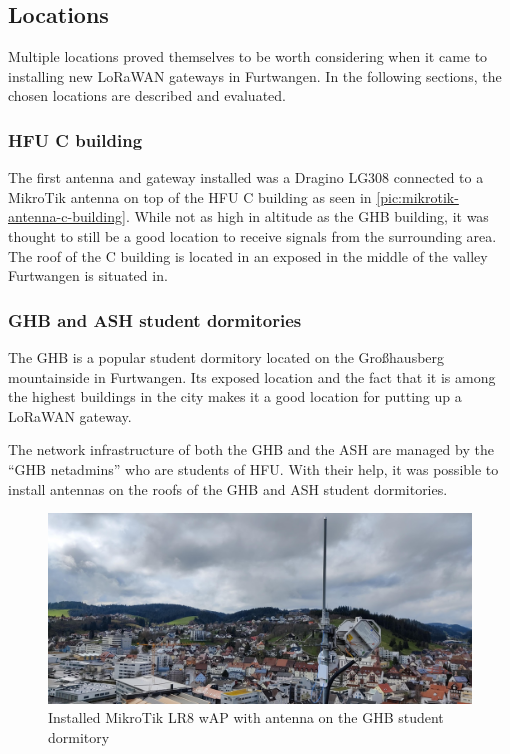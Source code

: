 \subsection{Locations}


Multiple locations proved themselves to be worth considering when it came to installing new \ac{LoRaWAN} gateways in Furtwangen.
In the following sections, the chosen locations are described and evaluated.

\subsubsection{\ac{HFU} C building}

The first antenna and gateway installed was a Dragino LG308 connected to a MikroTik antenna on top of the \ac{HFU} C building as seen in \cref{pic:mikrotik-antenna-c-building}.
While not as high in altitude as the \ac{GHB} building, it was thought to still be a good location to receive signals from the surrounding area.
The roof of the C building is located in an exposed in the middle of the valley Furtwangen is situated in.

\subsubsection{\acf{GHB} and \acf{ASH} student dormitories}

The \ac{GHB} is a popular student dormitory located on the Großhausberg mountainside in Furtwangen.
Its exposed location and the fact that it is among the highest buildings in the city makes it a good location for putting up a \ac{LoRaWAN} gateway.

The network infrastructure of both the \ac{GHB} and the \ac{ASH} are managed by the ``\ac{GHB} netadmins'' who are students of \ac{HFU}.
With their help, it was possible to install antennas on the roofs of the \ac{GHB} and \ac{ASH} student dormitories.

\begin{figure}[h]
    \centering
    \includegraphics[width=1\textwidth]{pictures/hardware/gateway-deployment/lr8_ghb_installation.jpg}
    \caption{Installed MikroTik LR8 wAP with antenna on the GHB student dormitory~\label{pic:mikrotik-gateway-ghb-installation}}
\end{figure}


